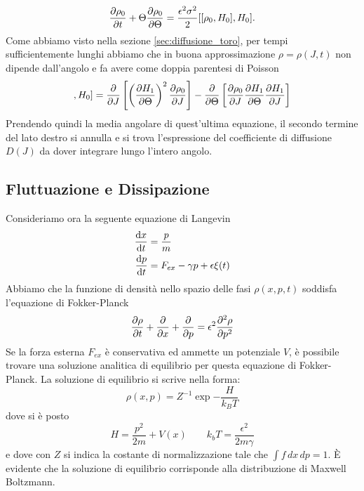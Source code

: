 \documentclass[10pt,a4paper]{article}
\begin{document}
\begin{equation}
 	\pdv{\rho_0}{t} + \Theta \pdv{\rho_0}{\Theta} = \frac{\epsilon^2 \sigma^2}{2}[[\rho_0, H_0], H_0].
\end{equation} 
Come abbiamo visto nella sezione \ref{sec:diffusione_toro}, per tempi sufficientemente lunghi abbiamo che in buona approssimazione $\rho = \rho(J,t)$ non dipende dall'angolo e fa avere come doppia parentesi di Poisson
\begin{equation}
	[[\rho_0, H_0], H_0] = \pdv{}{J}\left[\left(\pdv{H_1}{\Theta}\right)^2 \pdv{\rho_0}{J}\right] - \pdv{}{\Theta}\left[\pdv{\rho_0}{J}\pdv{H_1}{\Theta}\pdv{H_1}{J}\right]
\end{equation}
Prendendo quindi la media angolare di quest'ultima equazione, il secondo termine del lato destro si annulla e si trova l'espressione del coefficiente di diffusione $D(J)$ da dover integrare lungo l'intero angolo.

\subsection{Fluttuazione e Dissipazione}
\label{sec:fluttuazione_dissipazione}
Consideriamo ora la seguente equazione di Langevin
\begin{align}
	\dv{x}{t} &= \frac{p}{m}\\
	\dv{p}{t} &= F_{ex} - \gamma p + \epsilon\xi(t)
\end{align}
Abbiamo che la funzione di densità nello spazio delle fasi $\rho(x,p,t)$ soddisfa l'equazione di Fokker-Planck
\begin{equation}
	\pdv{\rho}{t} + \pdv{}{x} (\frac{p}{m}\rho) + \pdv{}{p} (F_{ex}\rho - \gamma p \rho) = \epsilon^2\pdv[2]{\rho}{p}
\end{equation}
Se la forza esterna $F_{ex}$ è conservativa ed ammette un potenziale $V$, è possibile trovare una soluzione analitica di equilibrio per questa equazione di Fokker-Planck. La soluzione di equilibrio si scrive nella forma:
\begin{equation}
	\rho(x,p) = Z^{-1} \exp{-\frac{H}{k_B T}}
\end{equation}
dove si è posto
\begin{equation}
	H = \frac{p^2}{2m} + V(x) \quad\quad k_b T = \frac{\epsilon^2}{2 m \gamma}
\end{equation}
e dove con $Z$ si indica la costante di normalizzazione tale che $\int f\,dx\,dp = 1$. È evidente che la soluzione di equilibrio corrisponde alla distribuzione di Maxwell Boltzmann.
\end{document}
